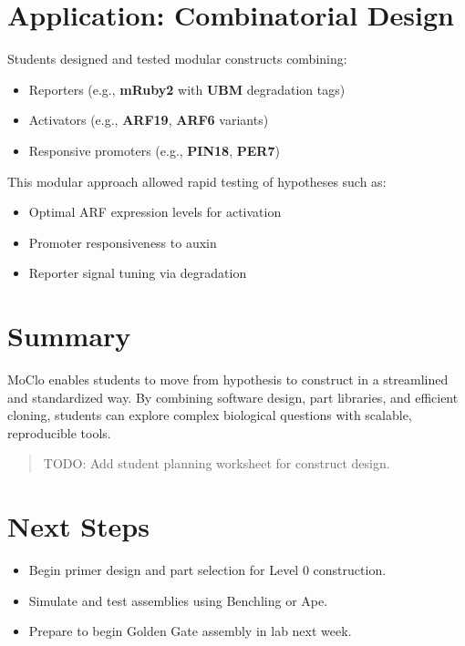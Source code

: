 \documentclass[
  letterpaper,
  DIV=11,
  numbers=noendperiod]{scrreprt}
\providecommand{\tightlist}{%
  \setlength{\itemsep}{0pt}\setlength{\parskip}{0pt}}\usepackage{longtable,booktabs,array}
\begin{document}
\section{Application: Combinatorial
Design}\label{application-combinatorial-design}

Students designed and tested modular constructs combining:

\begin{itemize}
\tightlist
\item
  Reporters (e.g., \textbf{mRuby2} with \textbf{UBM} degradation tags)
\item
  Activators (e.g., \textbf{ARF19}, \textbf{ARF6} variants)
\item
  Responsive promoters (e.g., \textbf{PIN18}, \textbf{PER7})
\end{itemize}

This modular approach allowed rapid testing of hypotheses such as:

\begin{itemize}
\tightlist
\item
  Optimal ARF expression levels for activation
\item
  Promoter responsiveness to auxin
\item
  Reporter signal tuning via degradation
\end{itemize}

\section{Summary}\label{summary}

MoClo enables students to move from hypothesis to construct in a
streamlined and standardized way. By combining software design, part
libraries, and efficient cloning, students can explore complex
biological questions with scalable, reproducible tools.

\begin{quote}
TODO: Add student planning worksheet for construct design.
\end{quote}

\section{Next Steps}\label{next-steps}

\begin{itemize}
\tightlist
\item
  Begin primer design and part selection for Level 0 construction.
\item
  Simulate and test assemblies using Benchling or Ape.
\item
  Prepare to begin Golden Gate assembly in lab next week.
\end{itemize}
\end{document}
